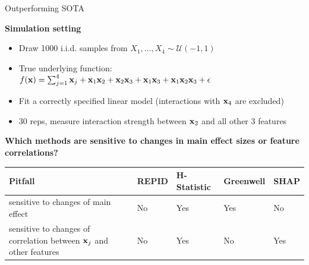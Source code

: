 \documentclass[10pt,compress,t,notes=noshow, xcolor=table]{beamer}
\begin{document}
\begin{frame}{Outperforming SOTA}

\textbf{Simulation setting}
\begin{itemize}
    \item Draw 1000 i.i.d. samples from $X_1, \ldots , X_4 \sim \mathcal{U}(-1,1)$
    \item True underlying function: $f(\mathbf{x}) = \sum\nolimits_{j=1}^4 \mathbf{x}_j + \mathbf{x}_1 \mathbf{x}_2 + \mathbf{x}_2 \mathbf{x}_3 + \mathbf{x}_1 \mathbf{x}_3 + \mathbf{x}_1 \mathbf{x}_2 \mathbf{x}_3 + \epsilon$ %
    \item Fit a correctly specified linear model (interactions with $\mathbf{x}_4$ are excluded)
    \item 30 reps, measure interaction strength between $\mathbf{x}_2$ and all other 3 features
\end{itemize}

\textbf{Which methods are sensitive to changes in main effect sizes or feature correlations?}


    \begin{table}[thb]
\vspace{.1in}
    \label{tab:simSummary}
    \begin{center}
    \begin{tabular}{|p{5.4cm}|p{1.6cm}|p{1.8cm}|p{1.6cm}|p{1.6cm}|}
    \hline
       Pitfall & REPID & H-Statistic & Greenwell & SHAP  \\\hline
       sensitive to changes of main effect & No & Yes & Yes & No\\\hline
       sensitive to changes of correlation between $\mathbf{x}_j$ and other features & No & Yes & No & Yes\\
  \hline
    \end{tabular}
    \end{center}
\end{table}
\vspace*{0.2cm}




\end{frame}
\end{document}
